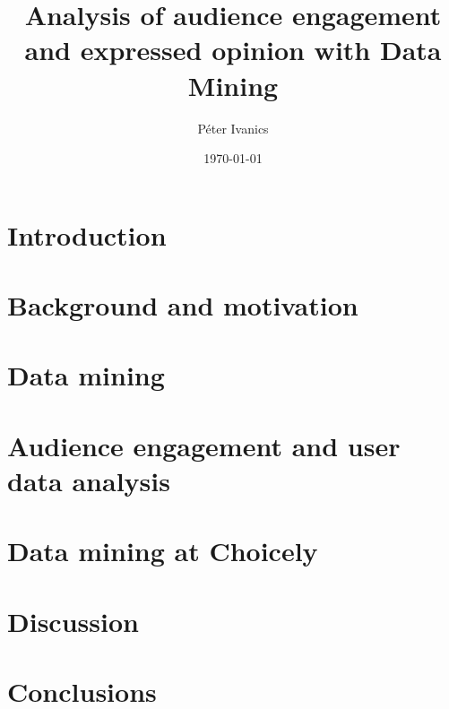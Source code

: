 \documentclass[english]{tktltiki}
\begin{document}
\onehalfspacing

\title{Analysis of audience engagement and expressed opinion with Data Mining}
\author{P\'eter Ivanics}

\date{\today}

\maketitle


\begin{abstract}
\end{abstract}

\mytableofcontents

	\section{Introduction}
	
	
	\section{Background and motivation}
	
	\section{Data mining}

	\section{Audience engagement and user data analysis}
	
	\section{Data mining at Choicely}
	\section{Discussion}

	\section{Conclusions}
    
\end{document}
